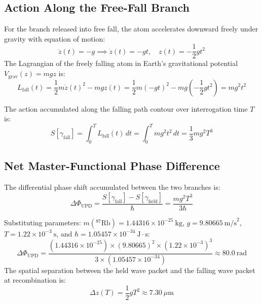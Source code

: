 \documentclass[11pt,a4paper]{article}
\begin{document}
\subsection{Action Along the Free-Fall Branch}

For the branch released into free fall, the atom accelerates downward freely under gravity with equation of motion:
\begin{equation}
\ddot{z}(t) = -g \implies \dot{z}(t) = -gt, \quad z(t) = -\frac{1}{2}g t^2
\end{equation}
The Lagrangian of the freely falling atom in Earth's gravitational potential $V_{\mathrm{grav}}(z) = mgz$ is:
\begin{equation}
L_{\mathrm{fall}}(t) = \frac{1}{2}m \dot{z}(t)^2 - m g z(t) = \frac{1}{2} m (-gt)^2 - m g \left( -\frac{1}{2} g t^2 \right) = m g^2 t^2
\end{equation}

The action accumulated along the falling path contour over interrogation time $T$ is:
\begin{equation}
S[\gamma_{\mathrm{fall}}] = \int_0^T L_{\mathrm{fall}}(t)\, dt = \int_0^T m g^2 t^2\, dt = \frac{1}{3} m g^2 T^3
\end{equation}

\subsection{Net Master-Functional Phase Difference}

The differential phase shift accumulated between the two branches is:
\begin{equation}
\Delta\Phi_{\mathrm{UPD}} = \frac{S[\gamma_{\mathrm{fall}}] - S[\gamma_{\mathrm{held}}]}{\hbar} = \frac{m g^2 T^3}{3\hbar}
\end{equation}

Substituting parameters: $m(^{87}\mathrm{Rb}) = 1.44316 \times 10^{-25}\ \mathrm{kg}$, $g = 9.80665\ \mathrm{m/s}^2$, $T = 1.22 \times 10^{-3}\ \mathrm{s}$, and $\hbar = 1.05457 \times 10^{-34}\ \mathrm{J\cdot s}$:
\begin{equation}
\Delta\Phi_{\mathrm{UPD}} = \frac{(1.44316 \times 10^{-25}) \times (9.80665)^2 \times (1.22 \times 10^{-3})^3}{3 \times (1.05457 \times 10^{-34})} \approx 80.0\ \mathrm{rad}
\end{equation}
The spatial separation between the held wave packet and the falling wave packet at recombination is:
\begin{equation}
\Delta z(T) = \frac{1}{2} g T^2 \approx 7.30\ \mu\mathrm{m}
\end{equation}
\end{document}
